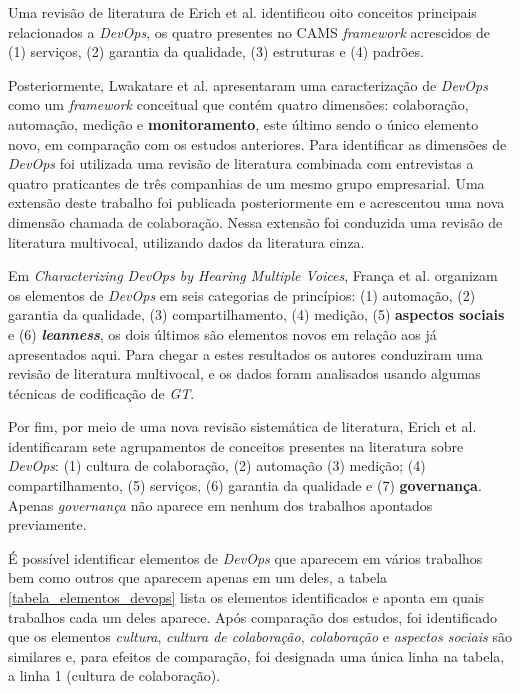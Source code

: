 Uma revisão de literatura de Erich et al. \cite{cooperation_dev_ops_esem_2014}
identificou oito conceitos principais relacionados a \textit{DevOps}, os quatro
presentes no \acrshort{CAMS} \textit{framework} acrescidos de (1) serviços,
(2) garantia da qualidade, (3) estruturas e (4) padrões.

Posteriormente, Lwakatare et al. \cite{dimensions_of_devops} apresentaram uma
caracterização de \textit{DevOps} como um \textit{framework} conceitual que
contém quatro dimensões: colaboração, automação, medição e
\textbf{monitoramento}, este último sendo o único elemento novo, em comparação
com os estudos anteriores. Para identificar as dimensões de \textit{DevOps} foi
utilizada uma revisão de literatura combinada com entrevistas a quatro
praticantes de três companhias de um mesmo grupo empresarial. Uma extensão
deste trabalho foi publicada posteriormente em \cite{extending_dimensions} e
acrescentou uma nova dimensão chamada de colaboração. Nessa extensão foi
conduzida uma revisão de literatura multivocal, utilizando dados da literatura
cinza.

Em \emph{Characterizing DevOps by Hearing Multiple Voices}, França et al.
\cite{characterizing_devops} organizam os elementos de \textit{DevOps} em seis
categorias de princípios: (1) automação, (2) garantia da qualidade,
(3) compartilhamento, (4) medição, (5) \textbf{aspectos sociais} e (6)
\textbf{\textit{leanness}}, os dois últimos são elementos novos em relação
aos já apresentados aqui. Para chegar a estes resultados os autores conduziram
uma revisão de literatura multivocal, e os dados foram analisados usando
algumas técnicas de codificação de \textit{\acrfull{GT}}.

Por fim, por meio de uma nova revisão sistemática de literatura, Erich et al.
\cite{qualitative_devops_journalsw_17} identificaram sete agrupamentos de
conceitos presentes na literatura sobre \textit{DevOps}: (1) cultura de
colaboração, (2) automação (3) medição; (4) compartilhamento, (5) serviços,
(6) garantia da qualidade e (7) \textbf{governança}. Apenas \emph{governança}
não aparece em nenhum dos trabalhos apontados previamente.

É possível identificar elementos de \textit{DevOps} que aparecem em vários
trabalhos bem como outros que aparecem apenas em um deles, a tabela
\ref{tabela_elementos_devops} lista os elementos identificados e aponta em
quais trabalhos cada um deles aparece. Após comparação dos estudos, foi
identificado que os elementos \emph{cultura}, \emph{cultura de colaboração},
\emph{colaboração} e \emph{aspectos sociais} são similares e, para efeitos de
comparação, foi designada uma única linha na tabela, a linha 1 (cultura de
colaboração).

